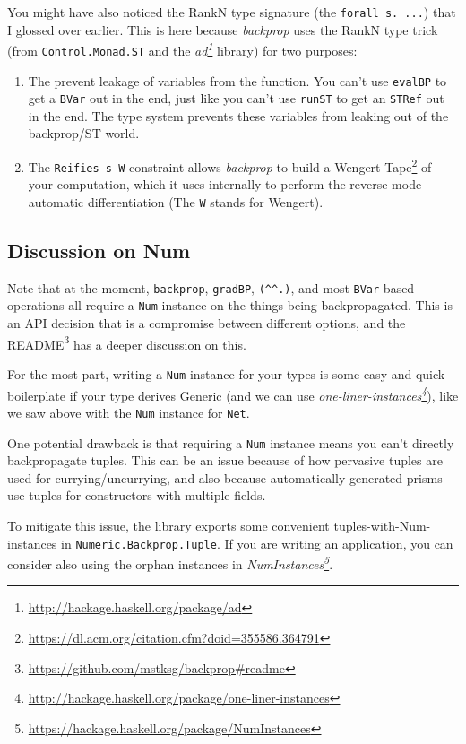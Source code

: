 \documentclass[]{article}
\renewcommand{\href}[2]{#2\footnote{\url{#1}}}
\begin{document}
You might have also noticed the RankN type signature (the
\texttt{forall\ s.\ ...}) that I glossed over earlier. This is here because
\emph{backprop} uses the RankN type trick (from \texttt{Control.Monad.ST} and
the \emph{\href{http://hackage.haskell.org/package/ad}{ad}} library) for two
purposes:

\begin{enumerate}
\def\labelenumi{\arabic{enumi}.}
\tightlist
\item
  The prevent leakage of variables from the function. You can't use
  \texttt{evalBP} to get a \texttt{BVar} out in the end, just like you can't use
  \texttt{runST} to get an \texttt{STRef} out in the end. The type system
  prevents these variables from leaking out of the backprop/ST world.
\item
  The \texttt{Reifies\ s\ W} constraint allows \emph{backprop} to build a
  \href{https://dl.acm.org/citation.cfm?doid=355586.364791}{Wengert Tape} of
  your computation, which it uses internally to perform the reverse-mode
  automatic differentiation (The \texttt{W} stands for Wengert).
\end{enumerate}

\hypertarget{discussion-on-num}{%
\subsection{Discussion on Num}\label{discussion-on-num}}

Note that at the moment, \texttt{backprop}, \texttt{gradBP},
\texttt{(\^{}\^{}.)}, and most \texttt{BVar}-based operations all require a
\texttt{Num} instance on the things being backpropagated. This is an API
decision that is a compromise between different options, and the
\href{https://github.com/mstksg/backprop\#readme}{README} has a deeper
discussion on this.

For the most part, writing a \texttt{Num} instance for your types is some easy
and quick boilerplate if your type derives Generic (and we can use
\emph{\href{http://hackage.haskell.org/package/one-liner-instances}{one-liner-instances}}),
like we saw above with the \texttt{Num} instance for \texttt{Net}.

One potential drawback is that requiring a \texttt{Num} instance means you can't
directly backpropagate tuples. This can be an issue because of how pervasive
tuples are used for currying/uncurrying, and also because automatically
generated prisms use tuples for constructors with multiple fields.

To mitigate this issue, the library exports some convenient
tuples-with-Num-instances in \texttt{Numeric.Backprop.Tuple}. If you are writing
an application, you can consider also using the orphan instances in
\emph{\href{https://hackage.haskell.org/package/NumInstances}{NumInstances}}.
\end{document}
